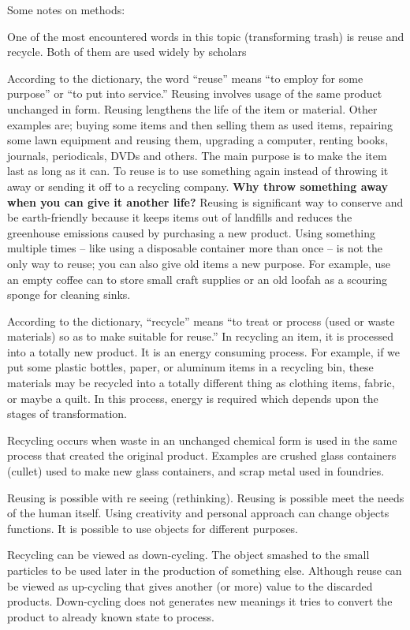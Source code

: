 Some notes on methods: 

One of the most encountered words in this topic (transforming trash) is reuse and recycle. Both of them are used widely by scholars 

According to the dictionary, the word “reuse” means “to employ for some purpose” or “to put into service.” Reusing involves usage of the same product unchanged in form. Reusing lengthens the life of the item or material. Other examples are; buying some items and then selling them as used items, repairing some lawn equipment and reusing them, upgrading a computer, renting books, journals, periodicals, DVDs and others. The main purpose is to make the item last as long as it can. To reuse is to use something again instead of throwing it away or sending it off to a recycling company. \textbf{Why throw something away when you can give it another life?} Reusing is significant way to conserve and be earth-friendly because it keeps items out of landfills and reduces the greenhouse emissions caused by purchasing a new product. Using something multiple times -- like using a disposable container more than once -- is not the only way to reuse; you can also give old items a new purpose. For example, use an empty coffee can to store small craft supplies or an old loofah as a scouring sponge for cleaning sinks.

According to the dictionary, “recycle” means “to treat or process (used or waste materials) so as to make suitable for reuse.” In recycling an item, it is processed into a totally new product. It is an energy consuming process. For example, if we put some plastic bottles, paper, or aluminum items in a recycling bin, these materials may be recycled into a totally different thing as clothing items, fabric, or maybe a quilt. In this process, energy is required which depends upon the stages of transformation.

Recycling occurs when waste in an unchanged chemical form is used in the same process that created the original product. Examples are crushed glass containers (cullet) used to make new glass containers, and scrap metal used in foundries. 

Reusing is possible with re seeing (rethinking). Reusing is possible meet the needs of the human itself. Using creativity and personal approach can change objects functions. It is possible to use objects for different purposes. 

Recycling can be viewed as down-cycling. The object smashed to the small particles to be used later in the production of something else. Although reuse can be viewed as up-cycling that gives another (or more) value to the discarded products. Down-cycling does not generates new meanings it tries to convert the product to already known state to process. 

